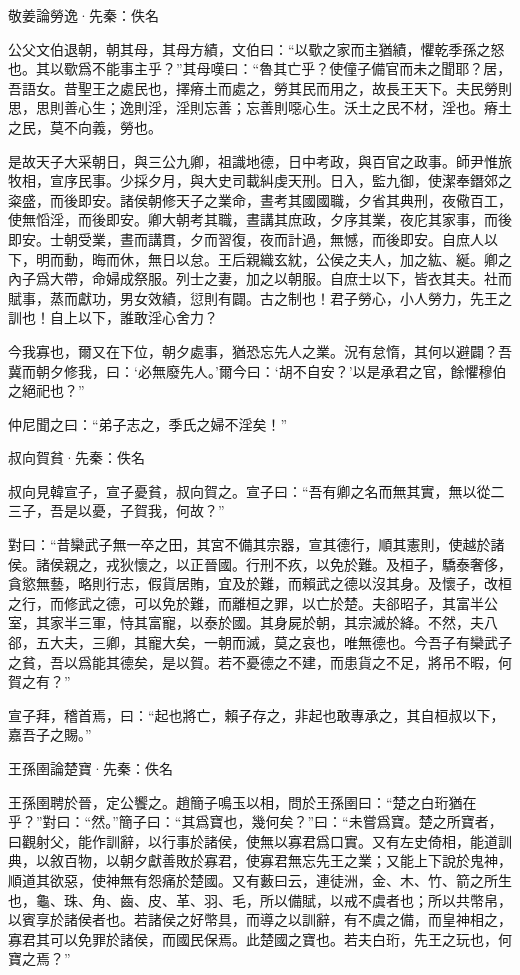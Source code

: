 \documentclass[12pt,a4paper]{ctexbook}
\begin{document}
敬姜論勞逸·先秦：佚名 \par
公父文伯退朝，朝其母，其母方績，文伯曰：“以歜之家而主猶績，懼乾季孫之怒也。其以歜爲不能事主乎？”其母嘆曰：“魯其亡乎？使僮子備官而未之聞耶？居，吾語女。昔聖王之處民也，擇瘠土而處之，勞其民而用之，故長王天下。夫民勞則思，思則善心生；逸則淫，淫則忘善；忘善則噁心生。沃土之民不材，淫也。瘠土之民，莫不向義，勞也。\par
是故天子大采朝日，與三公九卿，祖識地德，日中考政，與百官之政事。師尹惟旅牧相，宣序民事。少採夕月，與大史司載糾虔天刑。日入，監九御，使潔奉鐕郊之粢盛，而後即安。諸侯朝修天子之業命，晝考其國國職，夕省其典刑，夜儆百工，使無慆淫，而後即安。卿大朝考其職，晝講其庶政，夕序其業，夜庀其家事，而後即安。士朝受業，晝而講貫，夕而習復，夜而計過，無憾，而後即安。自庶人以下，明而動，晦而休，無日以怠。王后親織玄紞，公侯之夫人，加之紘、綖。卿之內子爲大帶，命婦成祭服。列士之妻，加之以朝服。自庶士以下，皆衣其夫。社而賦事，蒸而獻功，男女效績，愆則有闢。古之制也！君子勞心，小人勞力，先王之訓也！自上以下，誰敢淫心舍力？\par
今我寡也，爾又在下位，朝夕處事，猶恐忘先人之業。況有怠惰，其何以避闢？吾冀而朝夕修我，曰：‘必無廢先人。’爾今曰：‘胡不自安？’以是承君之官，餘懼穆伯之絕祀也？”\par
仲尼聞之曰：“弟子志之，季氏之婦不淫矣！”\par
叔向賀貧·先秦：佚名 \par
叔向見韓宣子，宣子憂貧，叔向賀之。宣子曰：“吾有卿之名而無其實，無以從二三子，吾是以憂，子賀我，何故？”\par
對曰：“昔欒武子無一卒之田，其宮不備其宗器，宣其德行，順其憲則，使越於諸侯。諸侯親之，戎狄懷之，以正晉國。行刑不疚，以免於難。及桓子，驕泰奢侈，貪慾無藝，略則行志，假貨居賄，宜及於難，而賴武之德以沒其身。及懷子，改桓之行，而修武之德，可以免於難，而離桓之罪，以亡於楚。夫郤昭子，其富半公室，其家半三軍，恃其富寵，以泰於國。其身屍於朝，其宗滅於絳。不然，夫八郤，五大夫，三卿，其寵大矣，一朝而滅，莫之哀也，唯無德也。今吾子有欒武子之貧，吾以爲能其德矣，是以賀。若不憂德之不建，而患貨之不足，將吊不暇，何賀之有？”\par
宣子拜，稽首焉，曰：“起也將亡，賴子存之，非起也敢專承之，其自桓叔以下，嘉吾子之賜。”\par
王孫圉論楚寶·先秦：佚名 \par
王孫圉聘於晉，定公饗之。趙簡子鳴玉以相，問於王孫圉曰：“楚之白珩猶在乎？”對曰：“然。”簡子曰：“其爲寶也，幾何矣？”曰：“未嘗爲寶。楚之所寶者，曰觀射父，能作訓辭，以行事於諸侯，使無以寡君爲口實。又有左史倚相，能道訓典，以敘百物，以朝夕獻善敗於寡君，使寡君無忘先王之業；又能上下說於鬼神，順道其欲惡，使神無有怨痛於楚國。又有藪曰云，連徒洲，金、木、竹、箭之所生也，龜、珠、角、齒、皮、革、羽、毛，所以備賦，以戒不虞者也；所以共幣帛，以賓享於諸侯者也。若諸侯之好幣具，而導之以訓辭，有不虞之備，而皇神相之，寡君其可以免罪於諸侯，而國民保焉。此楚國之寶也。若夫白珩，先王之玩也，何寶之焉？”\par
\end{document}
